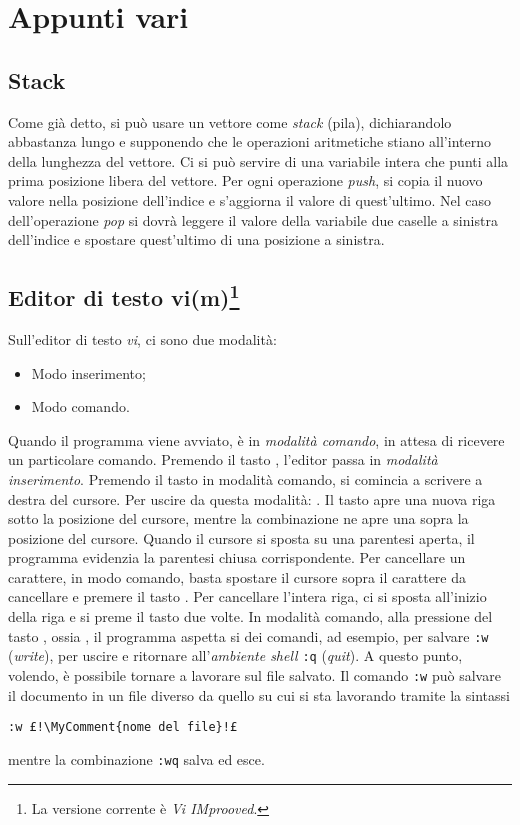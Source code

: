 \chapter{Appunti vari}
	\section{Stack}
	\label{sec:vari:stack}
Come già detto, si può usare un vettore come \emph{stack} (pila), dichiarandolo abbastanza lungo e supponendo che le operazioni aritmetiche stiano all'interno della lunghezza del vettore.
Ci si può servire di una variabile intera che punti alla prima posizione libera del vettore.
Per ogni operazione \emph{push}, si copia il nuovo valore nella posizione dell'indice e s'aggiorna il valore di quest'ultimo.
Nel caso dell'operazione \emph{pop} si dovrà leggere il valore della variabile due caselle a sinistra dell'indice e spostare quest'ultimo di una posizione a sinistra.

	\section[Editor di testo \textsf{vi(m)}]{Editor di testo vi(m)\protect\footnote{{L}a versione corrente è \emph{Vi IMprooved}.}}
Sull'editor di testo \emph{vi}, ci sono due modalità:
\begin{itemize}
	\item Modo inserimento;
	\item Modo comando.
\end{itemize}

Quando il programma viene avviato, è in \emph{modalità comando}, in attesa di ricevere un particolare comando.
Premendo il tasto , l'editor passa in \emph{modalità inserimento}.
Premendo il tasto  in modalità comando, si comincia a scrivere a destra del cursore.
Per uscire da questa modalità: .
Il tasto  apre una nuova riga sotto la posizione del cursore, mentre la combinazione  ne apre una sopra la posizione del cursore.
Quando il cursore si sposta su una parentesi aperta, il programma evidenzia la parentesi chiusa corrispondente.
Per cancellare un carattere, in modo comando, basta spostare il cursore sopra il carattere da cancellare e premere il tasto .
Per cancellare l'intera riga, ci si sposta all'inizio della riga e si preme il tasto  due volte.
In modalità comando, alla pressione del tasto \key{:}, ossia , il programma aspetta si dei comandi, ad esempio, per salvare \lstinline!:w! (\emph{write}), per uscire e ritornare all'\emph{ambiente shell} \lstinline!:q! (\emph{quit}).
A questo punto, volendo, è possibile tornare a lavorare sul file salvato.
Il comando \lstinline!:w! può salvare il documento in un file diverso da quello su cui si sta lavorando tramite la sintassi 
\begin{lstlisting}
:w £!\MyComment{nome del file}!£
\end{lstlisting}
mentre la combinazione \lstinline!:wq! salva ed esce.

